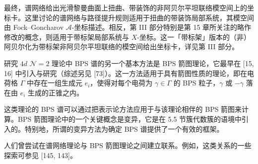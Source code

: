 最终，谱网络给出光滑黎曼曲面上扭曲、带装饰的非阿贝尔平坦联络模空间上的坐标卡。这里讨论的谱网络与路径提升规则适用于扭曲的带装饰局部系统，其模空间由 Fock–Goncharov $\mathcal{A}$-坐标描述。相反，第 III 部分特别是第 15 章所关注的略作修改的概念，则适用于带标架局部系统与 $X$-坐标。这一「带标架」版本的（非）阿贝尔化为带标架非阿贝尔平坦联络的模空间给出坐标卡，详见第 III 部分。

\begin{remark}[22.34]
研究 $4d$ $\mathcal{N}=2$ 理论中 BPS 谱的另一个基本方法是 BPS 箭图理论，它最早在 [15, 16] 中引入与研究（综述另见 [73]）。这一方法适用于具有箭图性质的理论，即在电荷格 $\Gamma$ 中存在一组生成元 $e_i$，使得对每个电荷为 $\gamma\in\Gamma$ 的 BPS 粒子，$\gamma$ 或 $-\gamma$ 落在由 $e_i$ 生成的正锥之内。

这类理论的 BPS 谱可以通过把表示论方法应用于与该理论相伴的 BPS 箭图来计算。BPS 箭图理论中的一个关键概念是变异，它是在 5.5 节簇代数簇的语境中引入的。特别地，所谓的变异方法为确定 BPS 谱提供了一个有效的框架。

人们曾尝试在谱网络理论与 BPS 箭图理论之间建立联系。例如，这类关系的一些探索可参见 [145, 143]。
\end{remark}
